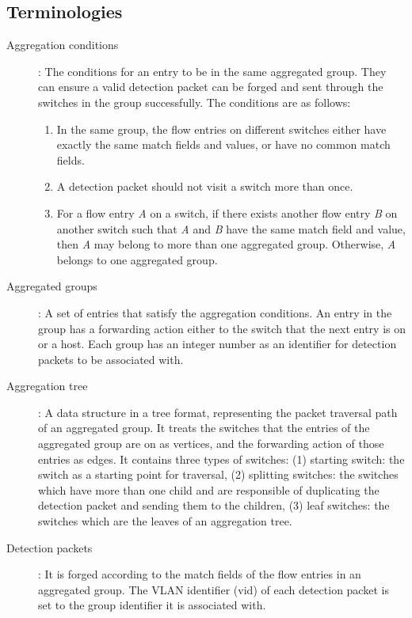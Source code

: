 \subsection{Terminologies}

\begin{description}%

\item
[Aggregation conditions]:
The conditions for an entry to be in the same aggregated group. They can ensure a valid detection packet can be forged and sent through the switches in the group successfully. The conditions are as follows:
\begin{enumerate}[label={\arabic*)}]
\item
In the same group, the flow entries on different switches either have exactly the same match fields and values, or have no common match fields.
\item
A detection packet should not visit a switch more than once.
\item
For a flow entry \textit{A} on a switch, if there exists another flow entry \textit{B} on another switch such that \textit{A} and \textit{B} have the same match field and value, then \textit{A} may belong to more than one aggregated group. Otherwise, \textit{A} belongs to one aggregated group.

\end{enumerate}

\item
[Aggregated groups]: 
A set of entries that satisfy the aggregation conditions. An entry in the group has a forwarding action either to the switch that the next entry is on or a host. Each group has an integer number as an identifier for detection packets to be associated with.

\item 
[Aggregation tree]:
A data structure in a tree format, representing the packet traversal path of an aggregated group. It treats the switches that the entries of the aggregated group are on as vertices, and the forwarding action of those entries as edges. It contains three types of switches: (1) starting switch: the switch as a starting point for traversal, (2) splitting switches: the switches which have more than one child and are responsible of duplicating the detection packet and sending them to the children, (3) leaf switches: the switches which are the leaves of an aggregation tree.

\item
[Detection packets]:
It is forged according to the match fields of the flow entries in an aggregated group. The VLAN identifier (vid) of each detection packet is set to the group identifier it is associated with.


\end{description}
